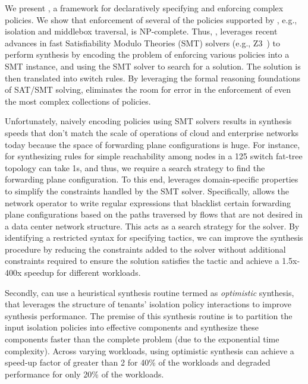 We present \Name, a framework for declaratively specifying and
enforcing complex policies.  We show that enforcement of several of
the policies supported by \Name, e.g., isolation and middlebox
traversal, is NP-complete. Thus, \Name, leverages recent advances in
fast Satisfiability Modulo Theories (SMT) solvers (e.g., Z3~\cite{z3})
to perform synthesis by encoding the problem of enforcing various
policies into a SMT instance, and using the SMT solver to search for a
solution. The solution is then translated into switch rules. %
By leveraging the formal reasoning foundations of SAT/SMT solving,
\Name eliminates the room for error in the enforcement of even the
most complex collections of policies.

Unfortunately, naively encoding policies using SMT solvers results in
synthesis speeds that don't match the scale of operations of cloud and
enterprise networks today because the space of forwarding plane configurations
is huge. For instance, for synthesizing rules for simple
reachability among nodes in a 125 switch fat-tree topology can take
1s, and thus, we require a search strategy to find the forwarding plane
configuration.  To this
end, \Name leverages domain-specific properties to simplify the
constraints handled by the SMT solver.  Specifically, \Name allows the
network operator to write regular expressions that blacklist certain
forwarding plane configurations based on the paths traversed by flows  
that are not desired in a data center network structure. This acts as a
search strategy for the solver. 
By identifying a restricted syntax for specifying
tactics, we can improve the synthesis procedure by reducing the
constraints added to the solver without additional constraints
required to ensure the solution satisfies the tactic and achieve
a 1.5x-400x speedup for different workloads.

 Secondly, \Name can use a heuristical synthesis routine termed as
 \emph{optimistic} synthesis, that leverages the structure of tenants'
 isolation policy interactions to improve synthesis performance. The
 premise of this synthesis routine is to partition the input isolation
 policies into effective components and synthesize these components
 faster than the complete problem (due to the exponential time
 complexity). Across varying workloads, using optimistic synthesis can
 achieve a speed-up factor of greater than 2 for 40\% of the workloads
 and degraded performance for only 20\% of the workloads.   

